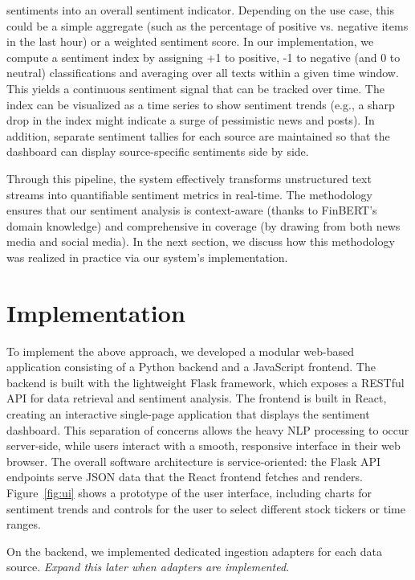 \documentclass[12pt]{article}
\begin{document}
\begin{enumerate}
        sentiments into an overall sentiment indicator. Depending on the use case, this could be a simple
        aggregate (such as the percentage of positive vs. negative items in the last hour) or a weighted
        sentiment score. In our implementation, we compute a sentiment index by assigning +1 to positive, -1
        to negative (and 0 to neutral) classifications and averaging over all texts within a given time
        window. This yields a continuous sentiment signal that can be tracked over time. The index can be
        visualized as a time series to show sentiment trends (e.g., a sharp drop in the index might indicate
        a surge of pessimistic news and posts). In addition, separate sentiment tallies for each source are
        maintained so that the dashboard can display source-specific sentiments side by side.
\end{enumerate}

Through this pipeline, the system effectively transforms unstructured text streams into quantifiable
sentiment metrics in real-time. The methodology ensures that our sentiment analysis is context-aware (thanks
to FinBERT's domain knowledge) and comprehensive in coverage (by drawing from both news media and social
media). In the next section, we discuss how this methodology was realized in practice via our system's
implementation.

\section{Implementation}
To implement the above approach, we developed a modular web-based application consisting of a Python backend
and a JavaScript frontend. The backend is built with the lightweight Flask framework, which exposes a RESTful
API for data retrieval and sentiment analysis. The frontend is built in React, creating an interactive
single-page application that displays the sentiment dashboard. This separation of concerns allows the heavy
NLP processing to occur server-side, while users interact with a smooth, responsive interface in their web
browser. The overall software architecture is service-oriented: the Flask API endpoints serve JSON data that
the React frontend fetches and renders. Figure~\ref{fig:ui} shows a prototype of the user
interface, including charts for sentiment trends and controls for the user to select different stock tickers or time ranges.

On the backend, we implemented dedicated ingestion adapters for each data source.
\textit{Expand this later when adapters are implemented}.
\end{document}
